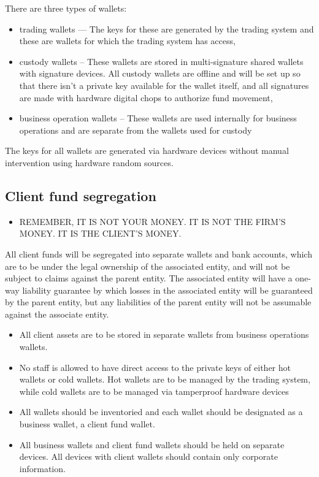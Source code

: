 There are three types of wallets:
\begin{itemize}
  \item trading wallets — The keys for these are generated by the
    trading system and these are wallets for which the trading system
    has access,
  \item custody wallets – These wallets are stored in multi-signature
    shared wallets with signature devices.  All custody wallets are
    offline and will be set up so that there isn't a private key
    available for the wallet itself, and all signatures are made with
    hardware digital chops to authorize fund movement,
  \item business operation wallets – These wallets are used internally
    for business operations and are separate from the wallets used for
    custody
\end{itemize}

The keys for all wallets are generated via hardware devices without
manual intervention using hardware random sources. 

\subsection{Client fund segregation}
\begin{itemize}
\item REMEMBER, IT IS NOT YOUR MONEY.  IT IS NOT THE FIRM'S MONEY.  IT IS THE CLIENT'S MONEY.
\end{itemize}

All client funds will be segregated into separate wallets and bank
accounts, which are to be under the legal ownership of the associated
entity, and will not be subject to claims against the parent entity.
The associated entity will have a one-way liability guarantee by
which losses in the associated entity will be guaranteed by the parent
entity, but any liabilities of the parent entity will not be assumable
against the associate entity.

\begin{itemize}
  \item All client assets are to be stored in separate wallets from
    business operations wallets.
  \item No staff is allowed to have direct access to the private keys
    of either hot
    wallets or cold wallets.  Hot wallets are to be managed by the
    trading system, while cold wallets are to be managed via
    tamperproof hardware devices 
  \item All wallets should be inventoried and each wallet should be designated
    as a business wallet, a client fund wallet.
  \item All business wallets and client fund wallets should be held on
separate devices.  All devices with client wallets should contain only
corporate information.
\end{itemize}

